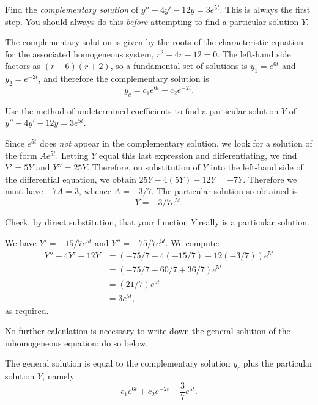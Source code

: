 \documentclass[answers,11pt]{exam}
\begin{document}
\begin{questions}

\question Find the \emph{complementary solution} of $y'' - 4y' - 12y = 3e^{5t}$. This is always the first step. You should always do this \emph{before} attempting to find a particular solution $Y$.

\begin{solution}
	The complementary solution is given by the roots of the characteristic equation for the associated homogeneous system, $r^2 - 4r - 12 = 0$. The left-hand side factors as $(r-6)(r+2)$, so a fundamental set of solutions is $y_1 = e^{6t}$ and $y_2 = e^{-2t}$, and therefore the complementary solution is
    \[
        y_c = c_1 e^{6t} + c_2 e^{-2t}.
    \]
\end{solution}

\question Use the method of undetermined coefficients to find a particular solution $Y$ of $y'' - 4y' - 12y = 3e^{5t}$.

\begin{solution}
	Since $e^{5t}$ does \emph{not} appear in the complementary solution, we look for a solution of the form $Ae^{5t}$. Letting $Y$ equal this last expression and differentiating, we find $Y' = 5Y$ and $Y'' = 25Y$. Therefore, on substitution of $Y$ into the left-hand side of the differential equation, we obtain $25Y - 4(5Y) - 12Y = -7Y$. Therefore we must have $-7A = 3$, whence $A = -3/7$. The particular solution so obtained is
    \[
        Y = -3/7 e^{5t}.
    \]
\end{solution}

\question Check, by direct substitution, that your function $Y$ really is a particular solution.

\begin{solution}
	We have $Y' = -15/7 e^{5t}$ and $Y'' = -75/7 e^{5t}$. We compute:
    \begin{align*}
        Y'' - 4Y' - 12Y &= (-75/7 - 4(-15/7) - 12(-3/7)) e^{5t} \\
        &= (-75/7 + 60/7 + 36/7) e^{5t} \\
        &= (21/7) e^{5t} \\
        &= 3e^{5t},
    \end{align*}
    as required.
\end{solution}

\question No further calculation is necessary to write down the general solution of the inhomogeneous equation: do so below.

\begin{solution}
    The general solution is equal to the complementary solution $y_c$ plus the particular solution $Y$, namely
    \[
      c_1 e^{6t} + c_2 e^{-2t} - \frac{3}{7} e^{5t}.
    \]
\end{solution}


\end{questions}
\end{document}
